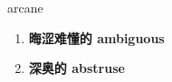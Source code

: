
\begin{frame}
{\huge arcane}
\begin{center}
\begin{enumerate}\Large
  \item \textbf{晦涩难懂的 ambiguous}
  \item \textbf{深奥的 abstruse}
\end{enumerate}
\end{center}
\end{frame}

